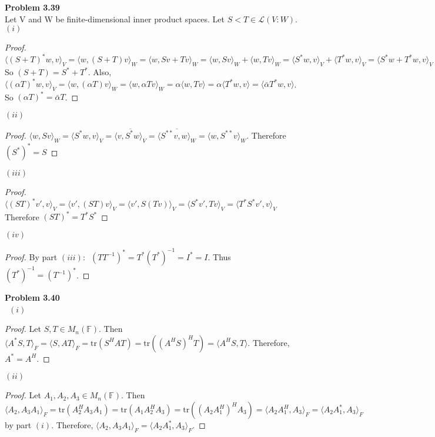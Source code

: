 \documentclass[letterpaper,12pt]{article}
\theoremstyle{definition}
\begin{document}
 \vspace{5mm}
 
\noindent\textbf{Problem 3.39}\\
 Let V and W be finite-dimensional inner product spaces. Let $S<T \in \mathcal{L}(V:W)$. \\
 
$(i)$  \begin{proof} $\langle(S+T)^*w,v \rangle_V= \langle w,(S+T)v \rangle_W= \langle
 w,Sv+Tv \rangle_W= \langle w,Sv\rangle_W+\langle w,Tv \rangle_W= \langle S^*w, v\rangle_V + \langle T^*w, v\rangle_V=
    \langle S^*w+T^*w,v \rangle_V$ So $(S+T)= S^* + T^*$.  Also, $\langle (\alpha T)^*w, v \rangle_V= \langle w,(\alpha T)v\rangle_W=
 \langle w,\alpha Tv \rangle_W= \alpha \langle w, Tv \rangle= \alpha \langle T^*w, v \rangle = \langle \bar{\alpha}T^*w,v \rangle$.  
So $(\alpha T)^* = \bar{\alpha}T$.  \end{proof}

\noindent $(ii)$  \begin{proof}     $\langle w,Sv\rangle_W= \langle S^*w, v\rangle_V=
  \overline{\langle v,S^*w\rangle_V}=\overline{\langle S^{**}v, w\rangle_W}=
  \langle w, S^{**}v \rangle_W$. Therefore $(S^*)^* = S$ \end{proof}

\noindent $(iii)$  \begin{proof}     $ \langle (ST)^*v', v\rangle_V= \langle v', (ST)v\rangle_V= \langle v',S(Tv)\rangle_V = \langle S^*v', Tv\rangle_V= \langle T^*S^*v', v\rangle_V$ Therefore $(ST)^* = T^*S^*$ 
\end{proof}
  
\noindent $(iv)$  \begin{proof}  By part $(iii):  \:\;  (TT^{-1})^* = T^*(T^*)^{-1} = I^* = I$.  Thus $(T^*)^{-1} = (T^{-1})^*$. 

\end{proof}  

  \vspace{5mm}
 
\noindent\textbf{Problem 3.40}\\
 \noindent\ $(i)$ \begin{proof} Let $ S, T \in M_n(\mathbb{F})$.  Then $\langle A^*S, T \rangle_F = \langle S, AT \rangle_F =\text{tr}(S^HAT) = \text{tr}((A^HS)^HT) = \langle A^HS, T \rangle $. Therefore, $A^* = A^H$.  \end{proof}

 \noindent $(ii)$ \begin{proof} Let $ A_1, A_2, A_3 \in M_n(\mathbb{F})$.  Then $\langle A_2, A_3A_1 \rangle_F = \text{tr}(A_2^HA_3A_1)= \text{tr}(A_1A_2^HA_3) = \text{tr}((A_2A_1^H)^HA_3) = \langle A_2A_1^H, A_3 \rangle_F = \langle A_2A_1^*, A_3 \rangle_F $ by part $(i)$. Therefore, $\langle A_2, A_3A_1 \rangle_F = \langle A_2A_1^*, A_3 \rangle_F$.  \end{proof}
 
\end{document}
